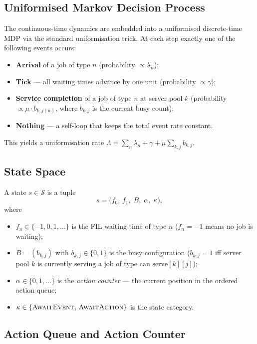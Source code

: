 \documentclass[11pt,a4paper]{article}
\begin{document}
\subsection{Uniformised Markov Decision Process}

The continuous-time dynamics are embedded into a uniformised discrete-time MDP
via the standard uniformisation trick.  At each step exactly one of the
following events occurs:
\begin{itemize}
  \item \textbf{Arrival} of a job of type $n$ (probability $\propto \lambda_n$);
  \item \textbf{Tick} --- all waiting times advance by one unit
        (probability $\propto \gamma$);
  \item \textbf{Service completion} of a job of type $n$ at server pool $k$
        (probability $\propto \mu \cdot b_{k,j(n)}$, where $b_{k,j}$ is the
        current busy count);
  \item \textbf{Nothing} --- a self-loop that keeps the total event rate
        constant.
\end{itemize}
This yields a uniformisation rate
$\Lambda = \sum_n \lambda_n + \gamma + \mu \sum_{k,j} b_{k,j}$.

\subsection{State Space}

A state $s \in \mathcal{S}$ is a tuple
\[
  s = \bigl(f_0,\, f_1,\; B,\; \alpha,\; \kappa \bigr),
\]
where
\begin{itemize}
  \item $f_n \in \{-1, 0, 1, \ldots\}$ is the FIL waiting time of type $n$
        ($f_n = -1$ means no job is waiting);
  \item $B = (b_{k,j})$ with $b_{k,j} \in \{0,1\}$ is the busy configuration
        ($b_{k,j} = 1$ iff server pool $k$ is currently serving a job of
        type $\text{can\_serve}[k][j]$);
  \item $\alpha \in \{0, 1, \ldots\}$ is the \emph{action counter} --- the
        current position in the ordered action queue;
  \item $\kappa \in \{\textsc{AwaitEvent},\, \textsc{AwaitAction}\}$ is the
        state category.
\end{itemize}

\subsection{Action Queue and Action Counter}
\end{document}
